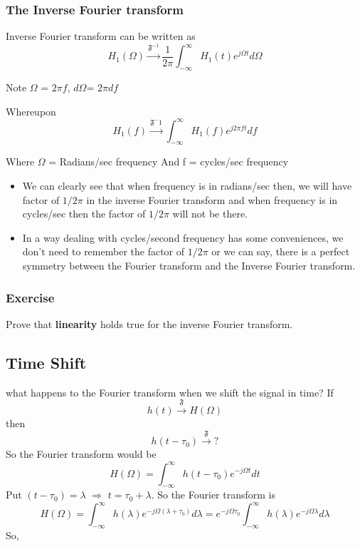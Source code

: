 \subsubsection{The Inverse Fourier transform}
Inverse Fourier transform can be written as
\begin{equation}
H_1(\Omega) \xrightarrow{\mathfrak{F}^{-1}} \frac{1}{2\pi} \int_{-\infty}^{\infty} {H_1(t)e^{j\Omega t}} d\Omega
\end{equation}

Note $\Omega$ = $2\pi f$, $d\Omega$= $2\pi df$

Whereupon
\begin{equation}
H_1(f) \xrightarrow{\mathfrak{F^-1}} \int_{-\infty}^{\infty} {H_1(f)e^{j2\pi ft}} df
\end{equation}

Where $\Omega$ =  Radians/sec frequency
And f = cycles/sec frequency

\begin{itemize}

\item We can clearly see that when frequency is in radians/sec then, we will have factor of $1/2\pi$ in the inverse Fourier transform and when frequency is in cycles/sec then the factor of $1/2\pi$ will not be there.
\item In a way dealing with cycles/second frequency has some conveniences, we don't need to remember the factor of $1/2\pi$ or we can say, there is a perfect symmetry between the Fourier transform and the Inverse Fourier transform.

\end{itemize}


\subsubsection{Exercise}
 Prove that \textbf{linearity} holds true for the inverse Fourier transform.



\subsection{Time Shift}
what happens to the Fourier transform when we shift the signal in time? If
\begin{equation}
h(t) \xrightarrow{\mathfrak{F}} H(\Omega)
\end{equation}
\noindent
then
\begin{equation}
h(t-\tau_0) \xrightarrow{\mathfrak{F}} {?}
\end{equation}
\noindent
So the Fourier transform would be
\begin{equation}
H(\Omega) =  \int_{-\infty}^{\infty} {h(t-\tau_0)e^{-j\Omega t}} dt
\end{equation}
Put $(t-\tau_0) = \lambda$  $\Rightarrow$  $t = \tau_0 + \lambda$.
So the Fourier transform is
\begin{equation}
H(\Omega) =  \int_{-\infty}^{\infty} {h(\lambda)e^{-j\Omega (\lambda + \tau_0)}} d\lambda =
e^{-j\Omega \tau_0}\int_{-\infty}^{\infty} {h(\lambda)e^{-j\Omega \lambda}} d\lambda
\end{equation}
\noindent
So,

